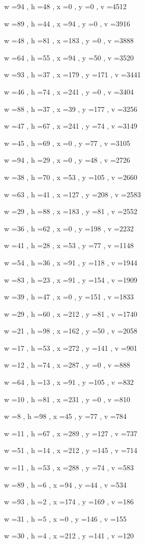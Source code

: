 \documentclass[11pt]{article}
\begin{document}
w =94 , h =48 , x =0 , y =0 , v =4512
\par
w =89 , h =44 , x =94 , y =0 , v =3916
\par
w =48 , h =81 , x =183 , y =0 , v =3888
\par
w =64 , h =55 , x =94 , y =50 , v =3520
\par
w =93 , h =37 , x =179 , y =171 , v =3441
\par
w =46 , h =74 , x =241 , y =0 , v =3404
\par
w =88 , h =37 , x =39 , y =177 , v =3256
\par
w =47 , h =67 , x =241 , y =74 , v =3149
\par
w =45 , h =69 , x =0 , y =77 , v =3105
\par
w =94 , h =29 , x =0 , y =48 , v =2726
\par
w =38 , h =70 , x =53 , y =105 , v =2660
\par
w =63 , h =41 , x =127 , y =208 , v =2583
\par
w =29 , h =88 , x =183 , y =81 , v =2552
\par
w =36 , h =62 , x =0 , y =198 , v =2232
\par
w =41 , h =28 , x =53 , y =77 , v =1148
\par
w =54 , h =36 , x =91 , y =118 , v =1944
\par
w =83 , h =23 , x =91 , y =154 , v =1909
\par
w =39 , h =47 , x =0 , y =151 , v =1833
\par
w =29 , h =60 , x =212 , y =81 , v =1740
\par
w =21 , h =98 , x =162 , y =50 , v =2058
\par
w =17 , h =53 , x =272 , y =141 , v =901
\par
w =12 , h =74 , x =287 , y =0 , v =888
\par
w =64 , h =13 , x =91 , y =105 , v =832
\par
w =10 , h =81 , x =231 , y =0 , v =810
\par
w =8 , h =98 , x =45 , y =77 , v =784
\par
w =11 , h =67 , x =289 , y =127 , v =737
\par
w =51 , h =14 , x =212 , y =145 , v =714
\par
w =11 , h =53 , x =288 , y =74 , v =583
\par
w =89 , h =6 , x =94 , y =44 , v =534
\par
w =93 , h =2 , x =174 , y =169 , v =186
\par
w =31 , h =5 , x =0 , y =146 , v =155
\par
w =30 , h =4 , x =212 , y =141 , v =120
\par
\newpage
\end{document}
